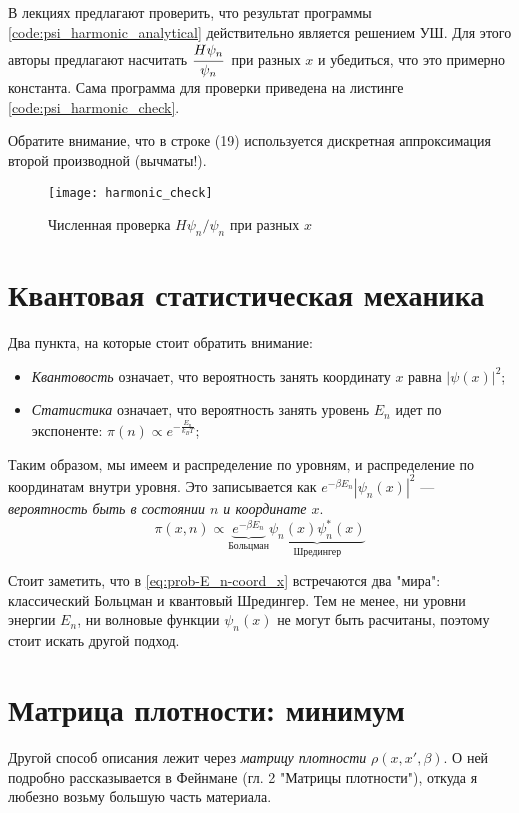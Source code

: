 \begin{lecture}
В лекциях предлагают проверить, что результат программы \ref{code:psi_harmonic_analytical} действительно является решением УШ.
Для этого авторы предлагают насчитать $\cfrac{H \psi_{n}}{\psi_{n} }\, $ при разных $x$ и убедиться, что это примерно константа.
Сама программа для проверки приведена на листинге \ref{code:psi_harmonic_check}.


Обратите внимание, что в строке (19) используется дискретная аппроксимация второй производной (вычматы!).
\begin{figure}[!h]
    \label{fig:harmonic_check}
    \centering
    \texttt{[image: harmonic\_check]}
    \caption{Численная проверка $H \psi_{n} / \psi_n$ при разных $x$}
\end{figure}

\section{Квантовая статистическая механика}
Два пункта, на которые стоит обратить внимание:
\begin{itemize}
    \item \textit{Квантовость} означает, что вероятность занять координату $x$ равна $|\psi (x)|^2$;
    \item \textit{Статистика} означает, что вероятность занять уровень $E_n$ идет по экспоненте: $\pi (n) \propto e^{-\frac{E_n}{k_B T}} $; 
\end{itemize}

Таким образом, мы имеем и распределение по уровням, и распределение по координатам внутри уровня.
Это записывается как $e^{-\beta E_n} |\psi_n (x)|^2$ --- \textit{вероятность быть в состоянии $n$ и координате $x$}.
\begin{equation}
    \label{eq:prob-E_n-coord_x}
    \pi (x, n) \propto \underbrace{e^{-\beta E_n}}_\text{Больцман} \underbrace{\psi_n (x) \psi_n^* (x)}_\text{Шредингер}
\end{equation}

Стоит заметить, что в \eqref{eq:prob-E_n-coord_x} встречаются два "мира": классический Больцман и квантовый Шредингер.
Тем не менее, ни уровни энергии $E_n$, ни волновые функции $\psi_n (x)$ не могут быть расчитаны, поэтому стоит искать другой подход.

\section{Матрица плотности: минимум}
Другой способ описания лежит через \textit{матрицу плотности} $\rho (x, x\prime, \beta)$.
О ней подробно рассказывается в Фейнмане \cite{feynman} (гл. 2 "Матрицы плотности"), откуда я любезно возьму большую часть материала.


\end{lecture}
